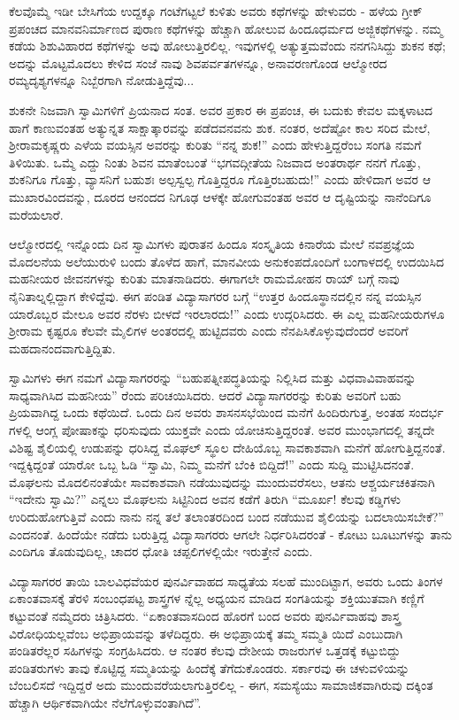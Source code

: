 ಕೆಲವೊಮ್ಮೆ ಇಡೀ ಬೇಸಿಗೆಯ ಉದ್ದಕ್ಕೂ ಗಂಟೆಗಟ್ಟಲೆ ಕುಳಿತು ಅವರು ಕಥೆಗಳನ್ನು ಹೇಳುವರು - ಹಳೆಯ ಗ್ರೀಕ್ ಪ್ರಪಂಚದ ಮಾನವನಿರ್ಮಾಣದ ಪುರಾಣ ಕಥೆಗಳನ್ನು ಹೆಚ್ಚಾಗಿ ಹೋಲುವ ಹಿಂದೂಧರ್ಮದ ಅಜ್ಜಿಕಥೆಗಳನ್ನು. ನಮ್ಮ ಕಡೆಯ ಶಿಶುವಿಹಾರದ ಕಥೆಗಳನ್ನು ಅವು ಹೋಲುತ್ತಿರಲಿಲ್ಲ. ಇವುಗಳಲ್ಲಿ ಅತ್ಯುತ್ತಮವೆಂದು ನನಗನಿಸಿದ್ದು ಶುಕನ ಕಥೆ; ಅದನ್ನು ಮೊಟ್ಟಮೊದಲು ಕೇಳಿದ ಸಂಜೆ ನಾವು ಶಿವಪರ್ವತಗಳನ್ನೂ, ಅನಾವರಣಗೊಂಡ ಆಲ್ಮೋರದ ರಮ್ಯದೃಶ್ಯಗಳನ್ನೂ ನಿಬ್ಬೆರಗಾಗಿ ನೋಡುತ್ತಿದ್ದೆವು...

ಶುಕನೇ ನಿಜವಾಗಿ ಸ್ವಾಮಿಗಳಿಗೆ ಪ್ರಿಯನಾದ ಸಂತ. ಅವರ ಪ್ರಕಾರ ಈ ಪ್ರಪಂಚ, ಈ ಬದುಕು ಕೇವಲ ಮಕ್ಕಳಾಟದ ಹಾಗೆ ಕಾಣುವಂತಹ ಅತ್ಯುನ್ನತ ಸಾಕ್ಷಾತ್ಕಾರವನ್ನು ಪಡೆದವನವನು ಶುಕ. ನಂತರ, ಅದೆಷ್ಟೋ ಕಾಲ ಸರಿದ ಮೇಲೆ, ಶ‍್ರೀರಾಮಕೃಷ್ಣರು ಎಳೆಯ ವಯಸ್ಸಿನ ಅವರನ್ನು ಕುರಿತು “ನನ್ನ ಶುಕ!” ಎಂದು ಹೇಳುತ್ತಿದ್ದರೆಂಬ ಸಂಗತಿ ನಮಗೆ ತಿಳಿಯಿತು. ಒಮ್ಮೆ ಎದ್ದು ನಿಂತು ಶಿವನ ಮಾತೆಂಬಂತೆ “ಭಗವದ್ಗೀತೆಯ ನಿಜವಾದ ಅಂತರಾರ್ಥ ನನಗೆ ಗೊತ್ತು, ಶುಕನಿಗೂ ಗೊತ್ತು, ವ್ಯಾಸನಿಗೆ ಬಹುಶಃ ಅಲ್ಪಸ್ವಲ್ಪ ಗೊತ್ತಿದ್ದರೂ ಗೊತ್ತಿರಬಹುದು!” ಎಂದು ಹೇಳಿದಾಗ ಅವರ ಆ ಮುಖಾರವಿಂದವನ್ನು, ದೂರದ ಆನಂದದ ನಿಗೂಢ ಆಳಕ್ಕೇ ಹೋಗುವಂತಹ ಅವರ ಆ ದೃಷ್ಟಿಯನ್ನು ನಾನೆಂದಿಗೂ ಮರೆಯಲಾರೆ.

ಆಲ್ಮೋರದಲ್ಲಿ ಇನ್ನೊಂದು ದಿನ ಸ್ವಾಮಿಗಳು ಪುರಾತನ ಹಿಂದೂ ಸಂಸ್ಕೃತಿಯ ಕಿನಾರೆಯ ಮೇಲೆ ನವಪ್ರಜ್ಞೆಯ ಮೊದಲನೆಯ ಅಲೆಯುರುಳಿ ಬಂದು ತೊಳೆದ ಹಾಗೆ, ಮಾನವೀಯ ಅನುಕಂಪದೊಂದಿಗೆ ಬಂಗಾಳದಲ್ಲಿ ಉದಯಿಸಿದ ಮಹನೀಯರ ಜೀವನಗಳನ್ನು ಕುರಿತು ಮಾತನಾಡಿದರು. ಈಗಾಗಲೇ ರಾಮಮೋಹನ ರಾಯ್​ ಬಗ್ಗೆ ನಾವು ನೈನಿತಾಲ್ನಲ್ಲಿದ್ದಾಗ ಕೇಳಿದ್ದೆವು. ಈಗ ಪಂಡಿತ ವಿದ್ಯಾಸಾಗರರ ಬಗ್ಗೆ “ಉತ್ತರ ಹಿಂದೂಸ್ಥಾನದಲ್ಲಿನ ನನ್ನ ವಯಸ್ಸಿನ ಯಾರೊಬ್ಬರ ಮೇಲೂ ಅವರ ನೆರಳು ಬೀಳದೆ ಇರಲಾರದು!” ಎಂದು ಉದ್ಗರಿಸಿದರು. ಈ ಎಲ್ಲ ಮಹನೀಯರುಗಳೂ ಶ‍್ರೀರಾಮ ಕೃಷ್ಟರೂ ಕೆಲವೇ ಮೈಲಿಗಳ ಅಂತರದಲ್ಲಿ ಹುಟ್ಟಿದವರು ಎಂದು ನೆನಪಿಸಿಕೊಳ್ಳುವುದೆಂದರೆ ಅವರಿಗೆ ಮಹದಾನಂದವಾಗುತ್ತಿದ್ದಿತು.

ಸ್ವಾಮಿಗಳು ಈಗ ನಮಗೆ ವಿದ್ಯಾಸಾಗರರನ್ನು “ಬಹುಪತ್ನೀಪದ್ಧತಿಯನ್ನು ನಿಲ್ಲಿಸಿದ ಮತ್ತು ವಿಧವಾವಿವಾಹವನ್ನು ಸಾಧ್ಯವಾಗಿಸಿದ ಮಹನೀಯ” ರೆಂದು ಪರಿಚಯಿಸಿದರು. ಆದರೆ ವಿದ್ಯಾಸಾಗರರನ್ನು ಕುರಿತು ಅವರಿಗೆ ಬಹು ಪ್ರಿಯವಾಗಿದ್ದ ಒಂದು ಕಥೆಯಿದೆ. ಒಂದು ದಿನ ಅವರು ಶಾಸನಸಭೆಯಿಂದ ಮನೆಗೆ ಹಿಂದಿರುಗುತ್ತ, ಅಂತಹ ಸಂದರ್ಭ ಗಳಲ್ಲಿ ಆಂಗ್ಲ ಪೋಷಾಕನ್ನು ಧರಿಸುವುದು ಯುಕ್ತವೇ ಎಂದು ಯೋಚಿಸುತ್ತಿದ್ದರಂತೆ. ಅವರ ಮುಂಭಾಗದಲ್ಲಿ ತನ್ನದೇ ವಿಶಿಷ್ಟ ಶೈಲಿಯಲ್ಲಿ ಉಡುಪನ್ನು ಧರಿಸಿದ್ದ ಮೊಘಲ್ ಸ್ಥೂಲ ದೇಹಿಯೊಬ್ಬ ಸಾವಕಾಶವಾಗಿ ಮನೆಗೆ ಹೋಗುತ್ತಿದ್ದನಂತೆ. ಇದ್ದಕ್ಕಿದ್ದಂತೆ ಯಾರೋ ಒಬ್ಬ ಓಡಿ “ಸ್ವಾಮಿ, ನಿಮ್ಮ ಮನೆಗೆ ಬೆಂಕಿ ಬಿದ್ದಿದೆ!” ಎಂದು ಸುದ್ದಿ ಮುಟ್ಟಿಸಿದನಂತೆ. ಮೊಘಲನು ಮೊದಲಿನಂತೆಯೇ ಸಾವಕಾಶವಾಗಿ ನಡೆಯುವುದನ್ನು ಮುಂದುವರೆಸಲು, ಆತನು ಆಶ್ಚರ್ಯಚಕಿತನಾಗಿ “ಇದೇನು ಸ್ವಾಮಿ?” ಎನ್ನಲು ಮೊಘಲನು ಸಿಟ್ಟಿನಿಂದ ಅವನ ಕಡೆಗೆ ತಿರುಗಿ “ಮೂರ್ಖ! ಕೆಲವು ಕಡ್ಡಿಗಳು ಉರಿದುಹೋಗುತ್ತಿವೆ ಎಂದು ನಾನು ನನ್ನ ತಲೆ ತಲಾಂತರದಿಂದ ಬಂದ ನಡೆಯುವ ಶೈಲಿಯನ್ನು ಬದಲಾಯಿಸಬೇಕೆ?” ಎಂದನಂತೆ. ಹಿಂದೆಯೇ ನಡೆದು ಬರುತ್ತಿದ್ದ ವಿದ್ಯಾಸಾಗರರು ಆಗಲೇ ನಿರ್ಧರಿಸಿದರಂತೆ - ಕೋಟು ಬೂಟುಗಳನ್ನು ತಾನು ಎಂದಿಗೂ ತೊಡುವುದಿಲ್ಲ, ಚಾದರ ಧೋತಿ ಚಪ್ಪಲಿಗಳಲ್ಲಿಯೇ ಇರುತ್ತೇನೆ ಎಂದು.

ವಿದ್ಯಾಸಾಗರರ ತಾಯಿ ಬಾಲವಿಧವೆಯರ ಪುನರ್ವಿವಾಹದ ಸಾಧ್ಯತೆಯ ಸಲಹೆ ಮುಂದಿಟ್ಟಾಗ, ಅವರು ಒಂದು ತಿಂಗಳ ಏಕಾಂತವಾಸಕ್ಕೆ ತೆರಳಿ ಸಂಬಂಧಪಟ್ಟ ಶಾಸ್ತ್ರಗಳ ನ್ನೆಲ್ಲ ಅಧ್ಯಯನ ಮಾಡಿದ ಸಂಗತಿಯನ್ನು ಶಕ್ತಿಯುತವಾಗಿ ಕಣ್ಣಿಗೆ ಕಟ್ಟುವಂತೆ ನಮ್ಮೆದರು ಚಿತ್ರಿಸಿದರು. “ಏಕಾಂತವಾಸದಿಂದ ಹೊರಗೆ ಬಂದ ಅವರು ಪುನರ್ವಿವಾಹವು ಶಾಸ್ತ್ರ ವಿರೋಧಿಯಲ್ಲವೆಂಬ ಅಭಿಪ್ರಾಯವನ್ನು ತಳೆದಿದ್ದರು. ಈ ಅಭಿಪ್ರಾಯಕ್ಕೆ ತಮ್ಮ ಸಮ್ಮತಿ ಯಿದೆ ಎಂಬುದಾಗಿ ಪಂಡಿತರೆಲ್ಲರ ಸಹಿಗಳನ್ನು ಸಂಗ್ರಹಿಸಿದರು. ಆ ನಂತರ ಕೆಲವು ದೇಶೀಯ ರಾಜರುಗಳ ಒತ್ತಡಕ್ಕೆ ಕಟ್ಟುಬಿದ್ದು ಪಂಡಿತರುಗಳು ತಾವು ಕೊಟ್ಟಿದ್ದ ಸಮ್ಮತಿಯನ್ನು ಹಿಂದೆಕ್ಕೆ ತೆಗೆದುಕೊಂಡರು. ಸರ್ಕಾರವು ಈ ಚಳುವಳಿಯನ್ನು ಬೆಂಬಲಿಸದೆ ಇದ್ದಿದ್ದರೆ ಅದು ಮುಂದುವರೆಯಲಾಗುತ್ತಿರಲಿಲ್ಲ - ಈಗ, ಸಮಸ್ಯೆಯು ಸಾಮಾಜಿಕವಾಗಿರುವು ದಕ್ಕಿಂತ ಹೆಚ್ಚಾಗಿ ಆರ್ಥಿಕವಾಗಿಯೇ ನೆಲೆಗೊಳ್ಳುವಂತಾಗಿದೆ”.

